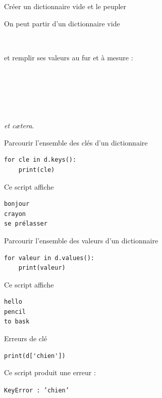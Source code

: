 \documentclass[10pt]{beamer}
\begin{document}
\begin{frame}{Créer un dictionnaire vide et le peupler}

On peut partir d'un dictionnaire vide  \\\pause

\\\pause

et remplir ses valeurs au fur et à mesure :

\\\pause

\\\pause

\\\pause

\textit{et c\ae tera}.
\end{frame}

\begin{frame}[fragile]{Parcourir l'ensemble des clés d'un dictionnaire}\pause
\begin{verbatim}
for cle in d.keys():
    print(cle)
\end{verbatim}

\pause Ce script affiche \pause
\begin{verbatim}
bonjour
crayon
se prélasser
\end{verbatim}
\end{frame}

\begin{frame}[fragile]{Parcourir l'ensemble des valeurs d'un dictionnaire}\pause
\begin{verbatim}
for valeur in d.values():
    print(valeur)
\end{verbatim}

\pause Ce script affiche \pause
\begin{verbatim}
hello
pencil
to bask
\end{verbatim}
\end{frame}

\begin{frame}[fragile]{Erreurs de clé}
\begin{verbatim}
print(d['chien'])
\end{verbatim}

\pause Ce script produit une erreur : \pause

\color{red}\texttt{KeyError : 'chien'}
\end{frame}
\end{document}
